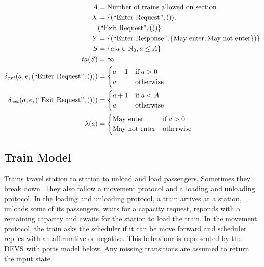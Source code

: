 \begin{align*}
    A &= \text{Number of trains allowed on section} \\
    X &= \{(\text{``Enter Request''}, ()), \\
        & (\text{``Exit Request''}, ())
    \} \\
    Y &= \{(\text{``Enter Response''}, \{\text{May enter}, \text{May not enter}\})\} \\
    S &= \{ a | a \in \mathbb{N}_0, a \leq A \} \\
    ta(S) &= \infty \\
    \delta_{ext}(a, e, (\text{``Enter Request''}, ())) &= 
        \begin{cases}
            a - 1 & \text{if\;} a > 0 \\
            a & \text{otherwise} \\
        \end{cases} \\
    \delta_{ext}(a, e, (\text{``Exit Request''}, ())) &= 
        \begin{cases}
            a + 1 & \text{if\;} a < A \\
            a & \text{otherwise} \\
        \end{cases} \\
    \lambda(a) &= 
        \begin{cases}
            \text{May enter} & \text{if\;} a > 0 \\
            \text{May not enter} & \text{otherwise} \\
        \end{cases}
\end{align*}

\subsection{Train Model}

Trains travel station to station to unload and load passengers. Sometimes they
break down. They also follow a movement protocol and a loading and unloading
protocol. In the loading and unloading protocol, a train arrives at a station,
unloads some of its passengers, waits for a capacity request, reponds with a
remaining capacity and awaits for the station to load the train. In the movement
protocol, the train asks the scheduler if it can be move forward and scheduler
replies with an affirmative or negative. This behaviour is represented by the
DEVS with ports model below. Any missing transitions are assumed to return the
input state. 

